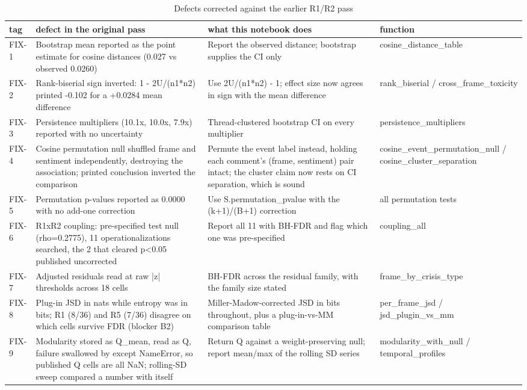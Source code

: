 \begin{table}
\caption{Defects corrected against the earlier R1/R2 pass}
\label{tab:r1r2_defect_register}
\begin{tabular}{llll}
\toprule
tag & defect in the original pass & what this notebook does & function \\
\midrule
FIX-1 & Bootstrap mean reported as the point estimate for cosine distances (0.027 vs observed 0.0260) & Report the observed distance; bootstrap supplies the CI only & cosine\_distance\_table \\
FIX-2 & Rank-biserial sign inverted: 1 - 2U/(n1*n2) printed -0.102 for a +0.0284 mean difference & Use 2U/(n1*n2) - 1; effect size now agrees in sign with the mean difference & rank\_biserial / cross\_frame\_toxicity \\
FIX-3 & Persistence multipliers (10.1x, 10.0x, 7.9x) reported with no uncertainty & Thread-clustered bootstrap CI on every multiplier & persistence\_multipliers \\
FIX-4 & Cosine permutation null shuffled frame and sentiment independently, destroying the association; printed conclusion inverted the comparison & Permute the event label instead, holding each comment's (frame, sentiment) pair intact; the cluster claim now rests on CI separation, which is sound & cosine\_event\_permutation\_null / cosine\_cluster\_separation \\
FIX-5 & Permutation p-values reported as 0.0000 with no add-one correction & Use S.permutation\_pvalue with the (k+1)/(B+1) correction & all permutation tests \\
FIX-6 & R1xR2 coupling: pre-specified test null (rho=0.2775), 11 operationalizations searched, the 2 that cleared p<0.05 published uncorrected & Report all 11 with BH-FDR and flag which one was pre-specified & coupling\_all \\
FIX-7 & Adjusted residuals read at raw |z| thresholds across 18 cells & BH-FDR across the residual family, with the family size stated & frame\_by\_crisis\_type \\
FIX-8 & Plug-in JSD in nats while entropy was in bits; R1 (8/36) and R5 (7/36) disagree on which cells survive FDR (blocker B2) & Miller-Madow-corrected JSD in bits throughout, plus a plug-in-vs-MM comparison table & per\_frame\_jsd / jsd\_plugin\_vs\_mm \\
FIX-9 & Modularity stored as Q\_mean, read as Q, failure swallowed by except NameError, so published Q cells are all NaN; rolling-SD sweep compared a number with itself & Return Q against a weight-preserving null; report mean/max of the rolling SD series & modularity\_with\_null / temporal\_profiles \\

\end{tabular}
\end{table}

